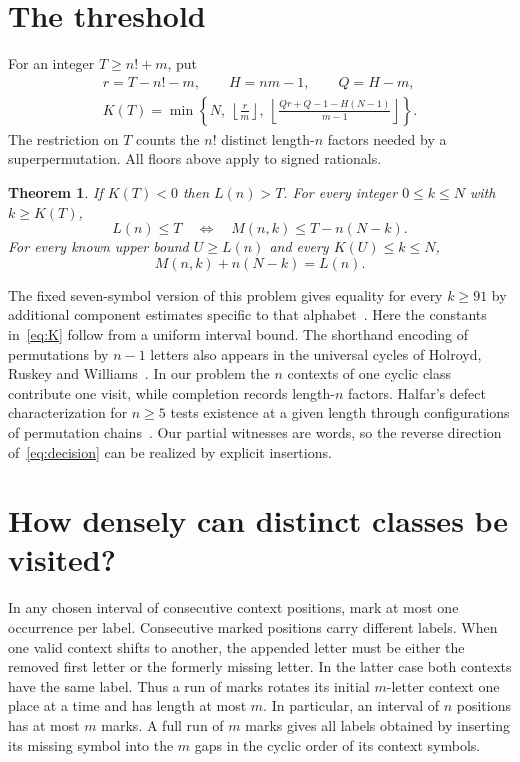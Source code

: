 \documentclass[11pt]{article}
\newtheorem{theorem}{Theorem}
\newcommand{\fl}[1]{\left\lfloor#1\right\rfloor}
\begin{document}
\section{The threshold}
For an integer $T\ge n!+m$, put
\begin{gather}
 r=T-n!-m,\qquad H=nm-1,\qquad Q=H-m,\nonumber\\
 K(T)=\min\left\{N,\ \fl{\frac rm},\
 \fl{\frac{Qr+Q-1-H(N-1)}{m-1}}\right\}.\label{eq:K}
\end{gather}
The restriction on $T$ counts the $n!$ distinct length-$n$ factors needed by a superpermutation. All floors above apply to signed rationals.

\begin{theorem}\label{th:main}
If $K(T)<0$ then $L(n)>T$. For every integer $0\le k\le N$ with $k\ge K(T)$,
\begin{equation}
   L(n)\le T\quad\Longleftrightarrow\quad M(n,k)\le T-n(N-k).
   \label{eq:decision}
\end{equation}
For every known upper bound $U\ge L(n)$ and every $K(U)\le k\le N$,
\begin{equation}
   M(n,k)+n(N-k)=L(n).\label{eq:equality}
\end{equation}
\end{theorem}

The fixed seven-symbol version of this problem gives equality for every $k\ge91$ by additional component estimates specific to that alphabet~\cite{seven}. Here the constants in~\eqref{eq:K} follow from a uniform interval bound. The shorthand encoding of permutations by $n-1$ letters also appears in the universal cycles of Holroyd, Ruskey and Williams~\cite{shorthand}. In our problem the $n$ contexts of one cyclic class contribute one visit, while completion records length-$n$ factors. Halfar's defect characterization for $n\ge5$ tests existence at a given length through configurations of permutation chains~\cite{halfar}. Our partial witnesses are words, so the reverse direction of~\eqref{eq:decision} can be realized by explicit insertions.

\section{How densely can distinct classes be visited?}
In any chosen interval of consecutive context positions, mark at most one occurrence per label. Consecutive marked positions carry different labels. When one valid context shifts to another, the appended letter must be either the removed first letter or the formerly missing letter. In the latter case both contexts have the same label. Thus a run of marks rotates its initial $m$-letter context one place at a time and has length at most $m$. In particular, an interval of $n$ positions has at most $m$ marks. A full run of $m$ marks gives all labels obtained by inserting its missing symbol into the $m$ gaps in the cyclic order of its context symbols.
\end{document}
